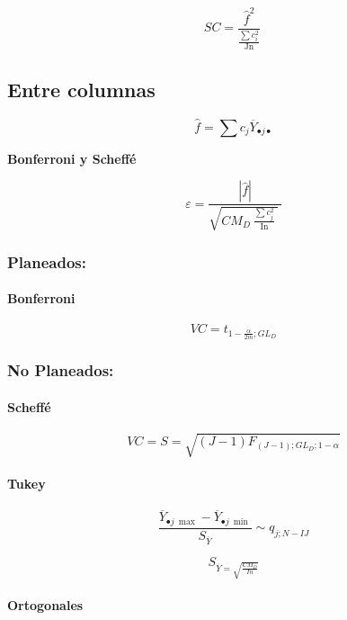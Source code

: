 \documentclass[]{book}
\let\oldparagraph\paragraph
\renewcommand{\paragraph}[1]{\oldparagraph{#1}\mbox{}}
\theoremstyle{definition}
\theoremstyle{definition}
\theoremstyle{definition}
\theoremstyle{remark}
\begin{document}
\[
SC = \frac{{\hat{f}}^{2}}{\frac{\sum c_{i}^{2}}{\text{Jn}}}\ 
\]

\hypertarget{entre-columnas}{%
\subsection{Entre columnas}\label{entre-columnas}}

\[
\hat{f} = \sum c_{j}{\overline{Y}_{\bullet j \bullet}}
\]

\textbf{Bonferroni y Scheffé}

\[
\varepsilon = \frac{\left| \hat{f} \right|}{\sqrt{CM_{D}\left. \ \frac{\sum c_{j}^{2}}{\text{In}} \right.\ }\ }
\]

\hypertarget{planeados-2}{%
\subsubsection{Planeados:}\label{planeados-2}}

\hypertarget{bonferroni-1}{%
\paragraph{Bonferroni}\label{bonferroni-1}}

\[
VC = t_{1 - \frac{\alpha}{2m};GL_{D}}
\]

\hypertarget{no-planeados-2}{%
\subsubsection{No Planeados:}\label{no-planeados-2}}

\hypertarget{scheffe-1}{%
\paragraph{Scheffé}\label{scheffe-1}}

\[
VC = S = \sqrt{\left( J - 1 \right)F_{\left( J - 1 \right);GL_{D};1 - \alpha}}
\]

\hypertarget{tukey-1}{%
\paragraph{Tukey}\label{tukey-1}}

\[
\frac{\overline{Y}_{\bullet j\ \max } - \overline{Y}_{\bullet j\ \min }}{S_{\overline{Y}}}\sim q_{j;N - IJ}
\]

\[
S_{\overline{Y} = \sqrt{\frac{CM_{D}}{In}}}
\]

\hypertarget{ortogonales-1}{%
\paragraph{Ortogonales}\label{ortogonales-1}}
\end{document}

